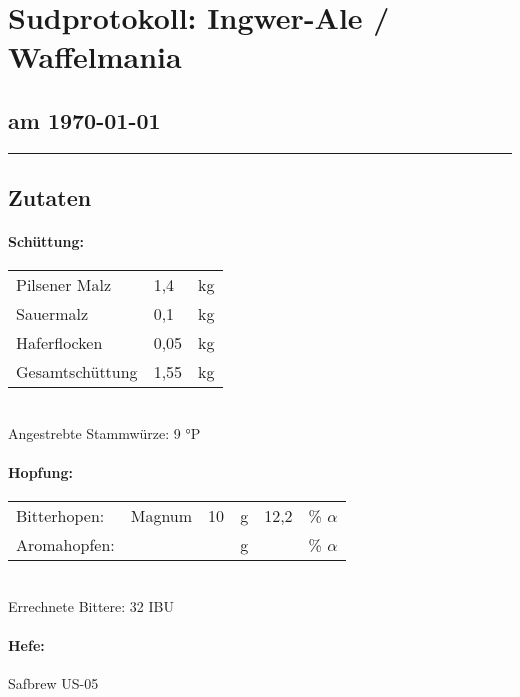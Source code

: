 \documentclass[12pt,oneside,a4paper]{scrartcl}
\begin{document}
	\begin{minipage}[c]{0.70\textwidth}
		\section*{\hspace{-.4cm}Sudprotokoll: Ingwer-Ale / Waffelmania}
	\end{minipage}
	\begin{minipage}[c]{0.29\textwidth}
		\subsection*{am \today}
	\end{minipage}
	\rule{\textwidth}{1pt}
%
\subsection*{Zutaten}
%
\paragraph{Schüttung:}
	\begin{tabular}[t]{m{8cm} m{2cm} m{1cm}}
		Pilsener Malz & 1,4 & kg\bigstrut\\
		Sauermalz & 0,1 & kg\bigstrut\\
		Haferflocken & 0,05 & kg \bigstrut\\ \hline
		Gesamtschüttung & 1,55 & kg\bigstrut
	\end{tabular}\\

\vspace{.25cm}
\hspace{1cm}Angestrebte Stammwürze: 9 °P
%
\paragraph{Hopfung:}
	\begin{tabular}[t]{m{2cm} m{5cm} m{0.5cm} m{1cm} m{0.5cm} m{1cm}}
		Bitterhopen: & Magnum & 10 & g & 12,2 & \% $\alpha$ \\
		Aromahopfen: & & & g & &  \% $\alpha$
	\end{tabular}\\

\vspace{.25cm}
\hspace{1cm}Errechnete Bittere: 32 IBU
%
\paragraph{Hefe:}
	Safbrew US-05
%
\end{document}
